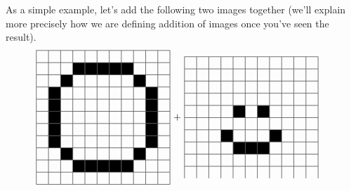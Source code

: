 As a simple example, let's add the following two images together (we'll explain more precisely how we are defining addition of images once you've seen the result).
\begin{align}
\begin{tabular}{|c|c|c|c|c|c|c|c|c|c|c|}
\hline
 &   &  &  & & & & & & & \\
 \hline
&    &   & \cellcolor{black}   & \cellcolor{black}   & \cellcolor{black}   & \cellcolor{black}  & \cellcolor{black}  & & & \\
 \hline
 &   &  \cellcolor{black} & & & & & & \cellcolor{black} & &    \\
 \hline
  &   \cellcolor{black} & & & & & & & & \cellcolor{black} &    \\
   \hline
    &   \cellcolor{black} & & & & & & & & \cellcolor{black} &    \\
     \hline
  &   \cellcolor{black} & & & & & & & & \cellcolor{black} &    \\
 \hline
  &   \cellcolor{black} & & & & & & & & \cellcolor{black} &    \\
   \hline
  &   \cellcolor{black} & & & & & & & & \cellcolor{black} &    \\
\hline
 &   &  \cellcolor{black} & & & & & & \cellcolor{black} & &    \\
 \hline
 &    &   & \cellcolor{black}   & \cellcolor{black}   & \cellcolor{black}   & \cellcolor{black}  & \cellcolor{black}  & & & \\
\hline
 &   &  &  & & & & & & & \\
 \hline
\end{tabular} ~+~& 
\begin{tabular}{|c|c|c|c|c|c|c|c|c|c|c|}
\hline
 &   &  &  & & & & & & & \\
 \hline
 &   &  &  & & & & & & & \\
 \hline
 &   &  &  & & & & & & & \\
 \hline
 &   &  &  & & & & & & & \\
   \hline
    &  & & & \cellcolor{black} & & \cellcolor{black}& & & &    \\
     \hline
 &   &  &  & & & & & & & \\
 \hline
  &  & &\cellcolor{black}  & & & & \cellcolor{black} & & &    \\
   \hline
  &  & & & \cellcolor{black} & \cellcolor{black}  & \cellcolor{black} & & & &    \\
\hline
 &   &  &  & & & & & & & \\
 \hline
 &   &  &  & & & & & & & \\

\end{tabular}
\end{align}
